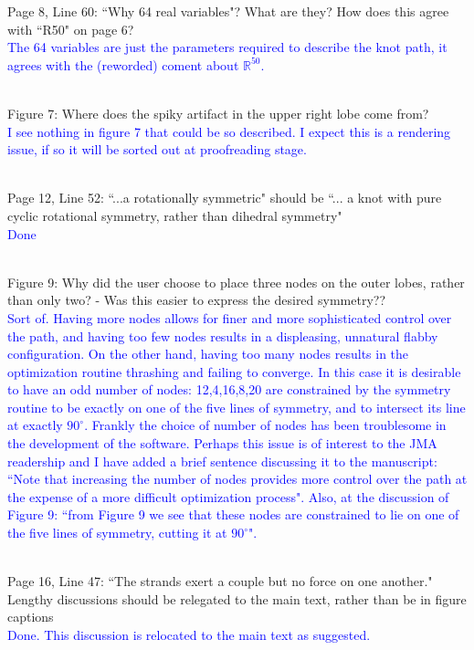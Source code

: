 \documentclass[12pt]{article}
\begin{document}
Page 8, Line 60: ``Why 64 real variables"?  What are they?  How does
this agree with ``R50" on page 6?\textcolor{blue}{\\ The 64 variables
  are just the parameters required to describe the knot path, it
  agrees with the (reworded) coment about $\mathbb{R}^{50}$.\\ \\}

Figure 7: Where does the spiky artifact in the upper right lobe come
from?  \textcolor{blue}{\\I see nothing in figure 7 that could be so
  described.  I expect this is a rendering issue, if so it will be
  sorted out at proofreading stage.\\ \\}

Page 12, Line 52: ``...a rotationally symmetric" should be ``... a knot with
pure cyclic rotational symmetry, rather than dihedral symmetry"
  \textcolor{blue}{\\Done\\ \\}

Figure 9: Why did the user choose to place three nodes on the outer
lobes, rather than only two? - Was this easier to express the desired
symmetry??  \textcolor{blue}{\\Sort of.  Having more nodes allows for
  finer and more sophisticated control over the path, and having too
  few nodes results in a displeasing, unnatural flabby configuration.
  On the other hand, having too many nodes results in the optimization
  routine thrashing and failing to converge.  In this case it is
  desirable to have an odd number of nodes: 12,4,16,8,20 are
  constrained by the symmetry routine to be exactly on one of the five
  lines of symmetry, and to intersect its line at exactly $90^\circ$.
  Frankly the choice of number of nodes has been troublesome in the
  development of the software.  Perhaps this issue is of interest to
  the JMA readership and I have added a brief sentence discussing it
  to the manuscript: ``Note that increasing the number of nodes
  provides more control over the path at the expense of a more
  difficult optimization process".  Also, at the discussion of Figure
  9: ``from Figure 9 we see that these nodes are constrained to lie on
  one of the five lines of symmetry, cutting it at $90^\circ$".\\ \\}

Page 16, Line 47: ``The strands exert a couple but no force on one
another."  Lengthy discussions should be relegated to the main text,
rather than be in figure captions \textcolor{blue}{\\Done.  This
  discussion is relocated to the main text as suggested.\\ \\}
\end{document}
